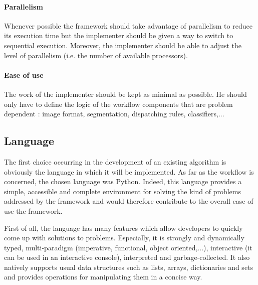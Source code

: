 \paragraph{Parallelism} Whenever possible the framework should take advantage of parallelism to reduce its execution time but the implementer should be given a way to switch to sequential execution. Moreover, the implementer should be able to adjust the level of parallelism (i.e. the number of available processors).

\paragraph{Ease of use} The work of the implementer should be kept as minimal as possible. He should only have to define the logic of the workflow components that are problem dependent : image format, segmentation, dispatching rules, classifiers,... 

\subsection{Language}
\label{ssec:work_language}
The first choice occurring in the development of an existing algorithm is obviously the language in which it will be implemented. As far as the workflow is concerned, the chosen language was Python. Indeed, this language provides a simple, accessible and complete environment for solving the kind of problems addressed by the framework and would therefore contribute to the overall ease of use the framework. 

First of all, the language has many features which allow developers to quickly come up with solutions to problems. Especially, it is strongly and dynamically typed, multi-paradigm (imperative, functional, object oriented,...), interactive (it can be used in an interactive console), interpreted and garbage-collected. It also natively supports usual data structures such as lists, arrays, dictionaries and sets and provides operations for manipulating them in a concise way. 

